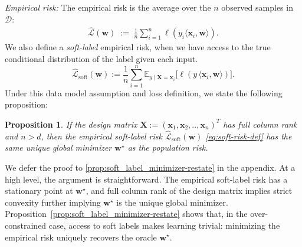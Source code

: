 \documentclass{article}
\theoremstyle{plain}
\newtheorem{proposition}[theorem]{Proposition}
\theoremstyle{definition}
\theoremstyle{remark}
\begin{document}
\textit{Empirical risk:} The empirical risk is the average over the $n$ observed samples in $\mathcal{D}$:
\begin{align}
\label{empirical-risk}
\widehat{\mathcal{L}}(\mathbf{w})
\;:=\;
\frac{1}{n}\sum_{i=1}^n
\ell\!\left(y_i\langle \mathbf{x}_i,\mathbf{w}\rangle\right).
\end{align}
We also define a \textit{soft-label} empirical risk, when we have access to the
true conditional distribution of the label given each input.
\begin{equation}
\widehat{\mathcal L}_{\mathrm{soft}}(\boldsymbol w)
:=
\frac{1}{n}\sum_{i=1}^n
\mathbb E_{y \mid \boldsymbol X=\boldsymbol x_i}
\big[
\ell\!\left(y\,\langle \boldsymbol x_i,\boldsymbol w\rangle\right)
\big].
\label{eq:soft-risk-def}
\end{equation}
Under this data model assumption and loss definition, we state the following proposition:

\begin{proposition}
\label{prop:soft_label_minimizer}
If the design matrix $\mathbf{X}:=(\mathbf{x}_{1},\mathbf{x}_{2},..,\mathbf{x}_{n})^T$ has full column rank and $n>d$, then the empirical soft-label risk $\widehat{\mathcal L}_{\mathrm{soft}}(\boldsymbol w)$ \eqref{eq:soft-risk-def}
has the same unique global minimizer $\mathbf w^\star$ as the population risk. 
\end{proposition}

We defer the proof to \ref{prop:soft_label_minimizer-restate} in the appendix.
At a high level, the argument is straightforward.
The empirical soft-label risk has a stationary point at $\mathbf w^\star$, and full column rank of the design matrix implies strict convexity further implying $\mathbf w^\star$ is the unique global minimizer. Proposition~\ref{prop:soft_label_minimizer-restate} shows that, in the over-constrained case, access to soft labels makes learning trivial: minimizing the empirical risk uniquely recovers the oracle $\mathbf w^\star$.
\end{document}
